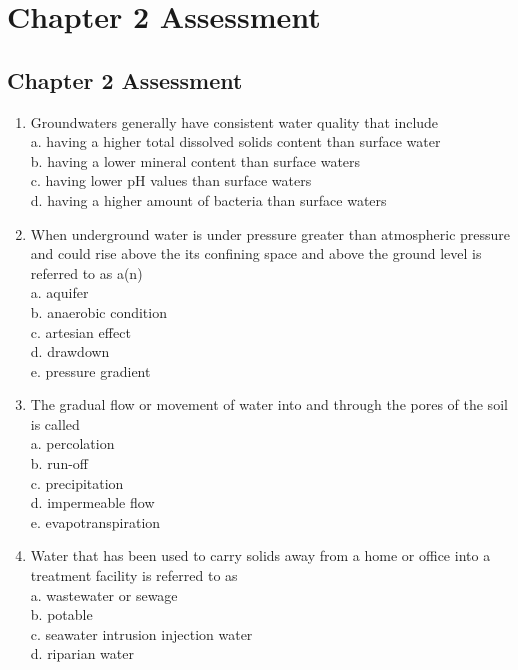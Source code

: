 
\chapter*{Chapter 2 Assessment}
\section*{Chapter 2 Assessment}
\begin{enumerate}[1.]
\item Groundwaters generally have consistent water quality that include\\
a. having a higher total dissolved solids content than surface water\\
b. having a lower mineral content than surface waters\\
c. having lower $\mathrm{pH}$ values than surface waters\\
d. having a higher amount of bacteria than surface waters\\
\item When underground water is under pressure greater than atmospheric pressure and could rise above the its confining space and above the ground level is referred to as a(n)\\
a. aquifer\\
b. anaerobic condition\\
c. artesian effect\\
d. drawdown\\
e. pressure gradient\\
\item The gradual flow or movement of water into and through the pores of the soil is called\\
a. percolation\\
b. run-off\\
c. precipitation\\
d. impermeable flow\\
e. evapotranspiration\\
\item Water that has been used to carry solids away from a home or office into a treatment facility is referred to as\\
a. wastewater or sewage\\
b. potable\\
c. seawater intrusion injection water\\
d. riparian water\\

\end{enumerate}
